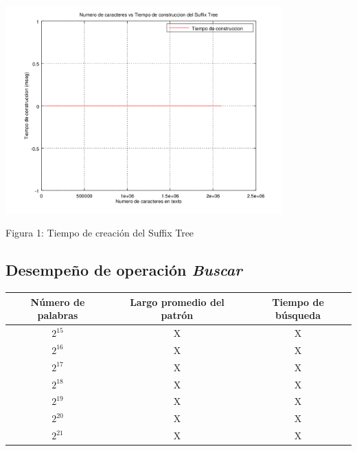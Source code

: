 \documentclass[letterpaper,10pt]{article}
\begin{document}
	\begin{center}
		\includegraphics[width=0.8\textwidth]{fig1.png}

		Figura 1: Tiempo de creación del Suffix Tree
	\end{center}

	\newpage

	\subsection{Desempeño de operación \textit{Buscar}}


	\begin{center}
		\begin{tabular}{|c|c|c|}
			\hline
			Número de palabras & Largo promedio del patrón & Tiempo de búsqueda\\
			\hline
			$2^{15}$ & X & X\\
			\hline
			$2^{16}$ & X & X\\
			\hline
			$2^{17}$ & X & X\\
			\hline
			$2^{18}$ & X & X\\
			\hline
			$2^{19}$ & X & X\\
			\hline
			$2^{20}$ & X & X\\
			\hline
			$2^{21}$ & X & X\\
			\hline
		\end{tabular}
	\end{center}
\end{document}

